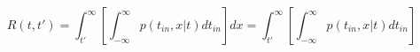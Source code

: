 \begin{equation}
R(t,t') = \int_{t'}^\infty \left[ \int_{-\infty}^\infty p(t_{in},x|t) dt_{in} \right]  dx = \int_{t'}^\infty \left[ \int_{-\infty}^\infty p(t_{in},x|t) dt_{in} \right]
\end{equation}